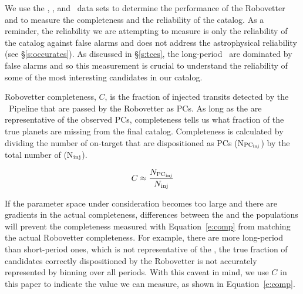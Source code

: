 %

\newcommand{\opsfp}{N$_{\rm FP_{\rm obs}}$}
\newcommand{\opspc}{N$_{\rm PC_{\rm obs}}$}
\newcommand{\opsN}{N$_{\rm obs}$}
\newcommand{\trueopspc}{T$_{\rm PC_{\rm obs}}$}
\newcommand{\missedfp}{T$_{\rm FP_{\rm obs}}$ - N$_{\rm FP_{\rm obs}}$}
\newcommand{\invfp}{N$_{\rm FP_{\rm inv}}$}
\newcommand{\invpc}{N$_{\rm PC_{\rm inv}}$}
\newcommand{\invN}{N$_{\rm inv}$}
\newcommand{\simfp}{N$_{\rm FP_{\rm sim}}$}
\newcommand{\simpc}{N$_{\rm PC_{\rm sim}}$}
\newcommand{\simN}{N$_{\rm sim}$}
\newcommand{\sfatce}{sfaTCE}


We use the \injtce, \scrtce, and \invtce\ data sets to determine the performance of the Robovetter and to measure the completeness and the reliability of the catalog. As a reminder, the reliability we are attempting to measure is only the reliability of the catalog against false alarms and does not address the astrophysical reliability (see \S\ref{s:occurates}). As discussed in \S\ref{s:tces}, the long-period \opstces\ are dominated by false alarms and so this measurement is crucial to understand the reliability of some of the most interesting candidates in our catalog.


Robovetter completeness, $C$, is the fraction of injected transits detected by the \Kepler\ Pipeline that are passed by the Robovetter as PCs.  As long as the  are representative of the observed PCs, completeness tells us what fraction of the true planets are missing from the final catalog.  Completeness is calculated by dividing the number of on-target  that are dispositioned as PCs (N$_{\rm PC_{\rm inj}}$) by the total number of  (N$_{\rm inj}$).

\begin{equation}
C \approx \frac{N_{\rm PC_{\rm inj}}}{N_{\rm inj}}
\label{e:comp}
\end{equation}

\noindent If the parameter space under consideration becomes too large and there are gradients in the actual completeness, differences between the \injtce and the \opstce{} populations will prevent the completeness measured with Equation~\ref{e:comp} from matching the actual Robovetter completeness. For example, there are more long-period  than short-period ones, which is not representative of the , the true fraction of candidates correctly dispositioned by the Robovetter is not accurately represented by binning over all periods. With this caveat in mind, we use $C$ in this paper to indicate the value we can measure, as shown in Equation~\ref{e:comp}.

